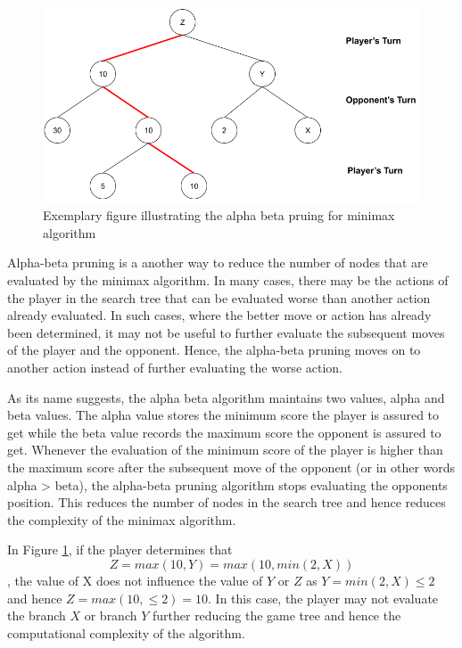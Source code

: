\begin{figure}[!ht]
    \centering
    \includegraphics[width=\linewidth]{../img/Minimax2.png}
    \caption{Exemplary figure illustrating the alpha beta pruing for minimax algorithm}
    \label{fig:minimax2}
\end{figure}

Alpha-beta pruning is a another way to reduce the number of nodes that are evaluated by the minimax algorithm. In many cases, there may be the actions of the player in the search tree that can be evaluated worse than another action already evaluated. In such cases, where the better move or action has already been determined, it may not be useful to further evaluate the subsequent moves of the player and the opponent. Hence, the alpha-beta pruning moves on to another action instead of further evaluating the worse action.

As its name suggests, the alpha beta algorithm maintains two values, alpha and beta values. The alpha value stores the minimum score the player is assured to get while the beta value records the maximum score the opponent is assured to get. Whenever the evaluation of the minimum score of the player is higher than the maximum score after the subsequent move of the opponent (or in other words alpha > beta), the alpha-beta pruning algorithm stops evaluating the opponents position. This reduces the number of nodes in the search tree and hence reduces the complexity of the minimax algorithm.

In Figure \ref{fig:minimax2}, if the player determines that 
\begin{equation}
    Z = max (10, Y) = max (10,  min (2, X))
\end{equation}
, the value of X does not influence the value of $Y$ or $Z$ as $Y = min(2, X) \leq 2$ and hence $Z = max(10, \leq 2) = 10$. In this case, the player may not evaluate the branch $X$ or branch $Y$ further reducing the game tree and hence the computational complexity of the algorithm. 

